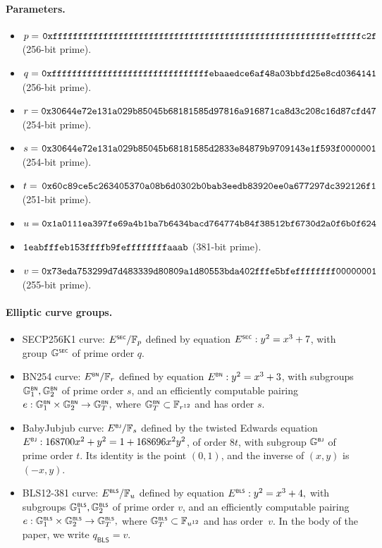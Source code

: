 \paragraph{Parameters.}

\begin{itemize}
	\item[$\bullet$] $p = \tt{\hspace{0.04cm}0xfffffffffffffffffffffffffffffffffffffffffffffffffffffffefffffc2f}$ (256-bit prime).
	\item[$\bullet$] $q = \tt{\hspace{0.01cm}0xfffffffffffffffffffffffffffffffebaaedce6af48a03bbfd25e8cd0364141}$ (256-bit prime).
	\item[$\bullet$] $r = \tt{0x30644e72e131a029b85045b68181585d97816a916871ca8d3c208c16d87cfd47}$ (254-bit prime).
	\item[$\bullet$] $s = \tt{\hspace{0.03cm}0x30644e72e131a029b85045b68181585d2833e84879b9709143e1f593f0000001}$ (254-bit prime).
	\item[$\bullet$] $t = \tt{\hspace{0.07cm}0x60c89ce5c263405370a08b6d0302b0bab3eedb83920ee0a677297dc392126f1}$ (251-bit prime).
	\item[$\bullet$] $u = \tt{0x1a0111ea397fe69a4b1ba7b6434bacd764774b84f38512bf6730d2a0f6b0f624}$
	\item[] \hspace{0.53cm} $\tt{1eabfffeb153ffffb9feffffffffaaab}$ (381-bit prime).
	\item[$\bullet$] $v = \tt{0x73eda753299d7d483339d80809a1d80553bda402fffe5bfeffffffff00000001}$ (255-bit prime).
\end{itemize}

\paragraph{Elliptic curve groups.}
\begin{itemize}
	\item SECP256K1 curve: ${E}^{\text{\tiny \sf SEC}}/\mathbb{F}_p$ defined by equation ${E}^{\text{\tiny \sf SEC}}: y^2 = x^3 + 7$, with group ${\mathbb{G}}^{\text{\tiny \sf SEC}}$ of prime order $q$.
	\item BN254 curve: ${E}^{\text{\tiny \sf BN}}/\mathbb{F}_r$ defined by equation \( {E}^{\text{\tiny \sf BN}}: y^2 = x^3 + 3\), with subgroups ${\mathbb{G}}^{\text{\tiny \sf BN}}_1, {\mathbb{G}}^{\text{\tiny \sf BN}}_2$ of prime order $s$, and an efficiently computable pairing \(e:{\mathbb{G}}^{\text{\tiny \sf BN}}_1\times{\mathbb{G}}^{\text{\tiny \sf BN}}_2 \rightarrow {\mathbb{G}}^{\text{\tiny \sf BN}}_T,\) where ${\mathbb{G}}^{\text{\tiny \sf BN}}_T \subset \mathbb{F}_{r^{12}}$ and has order $s$.
	\item BabyJubjub curve: ${E}^{\text{\tiny \sf BJ}}/\mathbb{F}_s$ defined by the twisted Edwards equation ${E}^{\text{\tiny \sf BJ}}: 168700 x^2 + y^2 = 1 + 168696 x^2y^2$, of order $8t$, with subgroup ${\mathbb{G}}^{\text{\tiny \sf BJ}}$ of prime order $t$. Its identity is the point $(0, 1)$, and the inverse of $(x, y)$ is $(-x, y)$.
	\item BLS12-381 curve: ${E}^{\text{\tiny \sf BLS}}/\mathbb{F}_u$ defined by equation \({E}^{\text{\tiny \sf BLS}}: y^2 = x^3 + 4,\) with subgroups ${\mathbb{G}}^{\text{\tiny \sf BLS}}_1, {\mathbb{G}}^{\text{\tiny \sf BLS}}_2$ of prime order $v$, and an efficiently computable pairing \({e}:{\mathbb{G}}^{\text{\tiny \sf BLS}}_1\times{\mathbb{G}}^{\text{\tiny \sf BLS}}_2 \rightarrow {\mathbb{G}}^{\text{\tiny \sf BLS}}_T,\) where ${\mathbb{G}}^{\text{\tiny \sf BLS}}_T \subset \mathbb{F}_{u^{12}}$ and has order~$v$. In the body of the paper, we write $q_{\mathsf{BLS}} = v$.
\end{itemize}

